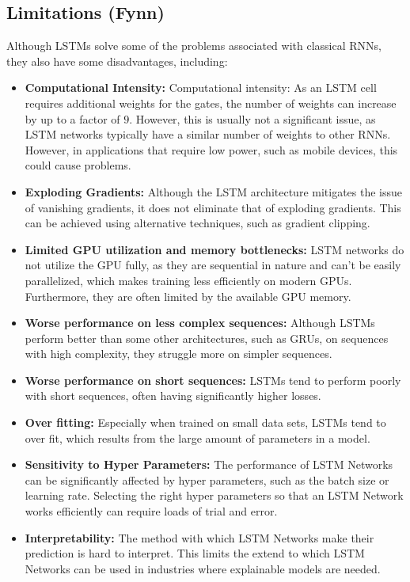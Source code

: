 \documentclass[twoside,a4paper,10pt,DIV=12,BCOR=12mm]{scrartcl}
\begin{document}
\subsection{Limitations (Fynn)}
Although LSTMs solve some of the problems associated with classical RNNs, they also have some disadvantages, including:
\begin{itemize}
    \item \textbf{Computational Intensity:} Computational intensity: As an LSTM cell requires additional weights for the gates, the number of weights can increase by up to a factor of \begin{math} 9 \end{math}. However, this is usually not a significant issue, as LSTM networks typically have a similar number of weights to other RNNs.\cite{hochreiter1997lstm}\\ However, in applications that require low power, such as mobile devices, this could cause problems. \cite{rizakisFPGAlstm}
    \item \textbf{Exploding Gradients:} Although the LSTM architecture mitigates the issue of vanishing gradients, it does not eliminate that of exploding gradients.\cite{pascanu2013rnntraining} This can be achieved using alternative techniques, such as gradient clipping.\cite{gradient-clipping, pascanu2013rnntraining}
    \item \textbf{Limited GPU utilization and memory bottlenecks:} LSTM networks do not utilize the GPU fully, as they are sequential in nature and can't be easily parallelized, which makes training less efficiently on modern GPUs. Furthermore, they are often limited by the available GPU memory.\cite{zheng2018scalability, zheng2020scalability}  
    \item \textbf{Worse performance on less complex sequences:} Although LSTMs perform better than some other architectures, such as GRUs, on sequences with high complexity, they struggle more on simpler sequences.\cite{cahuantzi2023lstmvsgru} 
    \item \textbf{Worse performance on short sequences:} LSTMs tend to perform poorly with short sequences, often having significantly higher losses. \cite{bolboaca2023lstmperformance} 
        \item \textbf{Over fitting:} Especially when trained on small data sets, LSTMs tend to over fit, which results from the large amount of parameters in a model. \cite{kinoyama2021overfitting}
        \item \textbf{Sensitivity to Hyper Parameters:} The performance of LSTM Networks can be significantly affected by hyper parameters, such as the batch size or learning rate. Selecting the right hyper parameters so that an LSTM Network works efficiently can require loads of trial and error. \cite{hochreiter1997lstm}
        \item \textbf{Interpretability:} The method with which LSTM Networks make their prediction is hard to interpret. This limits the extend to which LSTM Networks can be used in industries where explainable models are needed. \cite{firouzjaee2024interpret}
\end{itemize}
\end{document}
